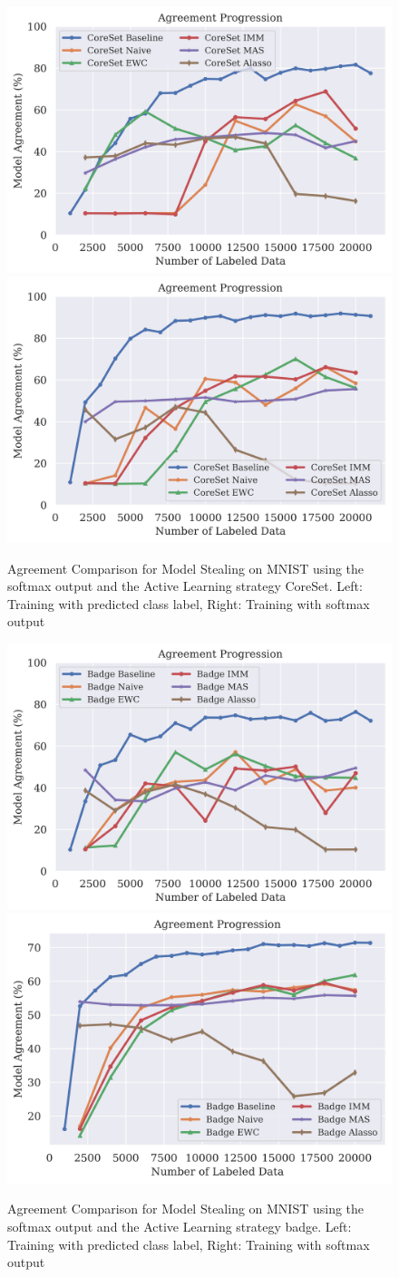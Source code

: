 \begin{figure}[!htb]
    \centering
    \includegraphics[width=0.48\linewidth]{images/results_CALMS/mnist_label_coreset.png} \hfill
    \includegraphics[width=0.48\linewidth]{images/results_CALMS/mnist_softmax_coreset.png}
    \caption{Agreement Comparison for Model Stealing on MNIST using the softmax output and the Active Learning strategy CoreSet. Left: Training with predicted class label,
    Right: Training with softmax output}
    \label{fig:CALMSMNISTCoreSet}
\end{figure}

\begin{figure}[!htb]
    \centering
    \includegraphics[width=0.48\linewidth]{images/results_CALMS/mnist_label_badge.png} \hfill
    \includegraphics[width=0.48\linewidth]{images/results_CALMS/cifar_softmax_badge.png}
    \caption{Agreement Comparison for Model Stealing on MNIST using the softmax output and the Active Learning strategy \gls{badge}. Left: Training with predicted class label,
    Right: Training with softmax output}
    \label{fig:CALMSMNISTBadge}
\end{figure}

